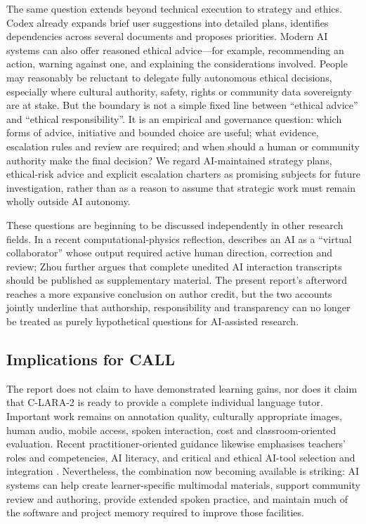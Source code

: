 The same question extends beyond technical execution to strategy and ethics.
Codex already expands brief user suggestions into detailed plans, identifies
dependencies across several documents and proposes priorities. Modern AI
systems can also offer reasoned ethical advice---for example, recommending an
action, warning against one, and explaining the considerations involved.
People may reasonably be reluctant to delegate fully autonomous ethical
decisions, especially where cultural authority, safety, rights or community
data sovereignty are at stake. But the boundary is not a simple fixed line
between ``ethical advice'' and ``ethical responsibility''. It is an empirical
and governance question: which forms of advice, initiative and bounded choice
are useful; what evidence, escalation rules and review are required; and when
should a human or community authority make the final decision? We regard
AI-maintained strategy plans, ethical-risk advice and explicit escalation
charters as promising subjects for future investigation, rather than as a
reason to assume that strategic work must remain wholly outside AI autonomy.

These questions are beginning to be discussed independently in other research
fields. In a recent computational-physics reflection, \citet{Zhou2026}
describes an AI as a ``virtual collaborator'' whose output required active
human direction, correction and review; Zhou further argues that complete
unedited AI interaction transcripts should be published as supplementary
material. The present report's afterword reaches a more expansive conclusion
on author credit, but the two accounts jointly underline that authorship,
responsibility and transparency can no longer be treated as purely hypothetical
questions for AI-assisted research.

\subsection{Implications for CALL}

The report does not claim to have demonstrated learning gains, nor does it
claim that C-LARA-2 is ready to provide a complete individual language tutor.
Important work remains on annotation quality, culturally appropriate images,
human audio, mobile access, spoken interaction, cost and classroom-oriented
evaluation. Recent practitioner-oriented guidance likewise emphasises teachers'
roles and competencies, AI literacy, and critical and ethical AI-tool selection
and integration \citep{SonPhilpott2026}. Nevertheless, the combination now
becoming available is striking:
AI systems can help create learner-specific multimodal materials, support
community review and authoring, provide extended spoken practice, and maintain
much of the software and project memory required to improve those facilities.

